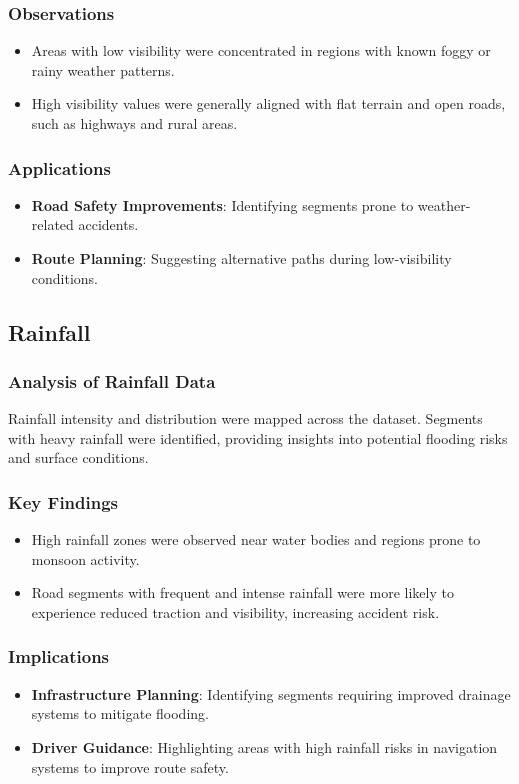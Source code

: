 \documentclass[sigplan,screen]{acmart}
\begin{document}
\subsubsection{Observations}
\begin{itemize}
    \item Areas with low visibility were concentrated in regions with known foggy or rainy weather patterns.
    \item High visibility values were generally aligned with flat terrain and open roads, such as highways and rural areas.
\end{itemize}

\subsubsection{Applications}
\begin{itemize}
    \item \textbf{Road Safety Improvements}: Identifying segments prone to weather-related accidents.
    \item \textbf{Route Planning}: Suggesting alternative paths during low-visibility conditions.
\end{itemize}

\subsection{Rainfall}
\subsubsection{Analysis of Rainfall Data}
Rainfall intensity and distribution were mapped across the dataset. Segments with heavy rainfall were identified, providing insights into potential flooding risks and surface conditions.

\subsubsection{Key Findings}
\begin{itemize}
    \item High rainfall zones were observed near water bodies and regions prone to monsoon activity.
    \item Road segments with frequent and intense rainfall were more likely to experience reduced traction and visibility, increasing accident risk.
\end{itemize}

\subsubsection{Implications}
\begin{itemize}
    \item \textbf{Infrastructure Planning}: Identifying segments requiring improved drainage systems to mitigate flooding.
    \item \textbf{Driver Guidance}: Highlighting areas with high rainfall risks in navigation systems to improve route safety.
\end{itemize}
\end{document}
